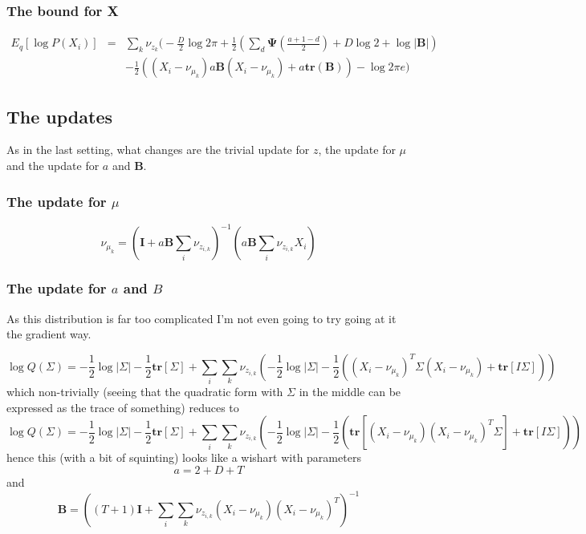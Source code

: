 \documentclass{article}
\newcommand{\digamma}{\bm{\Psi}}
\newcommand{\m}[1]{\nu_{#1}}
\begin{document}
\subsubsection{The bound for X}
\label{sec:bound-x-1}


\begin{eqnarray*}
  E_q[\log P(X_i)] &=& \sum_k \m{z_k} \Big( - \frac{D}{2}\log 2\pi 
    +\frac{1}{2}\left(\sum_d \digamma\left(\frac{a+1-d}{2}\right) 
    + D \log 2 + \log |\mathbf{B}|\right) \\
    && 
    -\frac{1}{2}((X_i - \m{\mu_k})a\mathbf{B}(X_i - \m{\mu_k})+ a\mathbf{tr}(\mathbf{B}))- \log 2 \pi e  \Big)
\end{eqnarray*}

\subsection{The updates}
\label{sec:updates-2}

As in the last setting, what changes are the trivial update for $z$,
the update for $\mu$ and the update for $a$ and $\mathbf{B}$.

\subsubsection{The update for $\mu$}
\label{sec:update-mu-3}

\begin{equation}
  \m{\mu_k} = \left(\mathbf{I}+ a\mathbf{B}\sum_i \m{z_{i,k}}\right)^{-1}
    \left(a\mathbf{B}\sum_i \m{z_{i,k}} X_i\right)
\end{equation}

\subsubsection{The update for $a$ and $B$}
\label{sec:update-a-b}

As this distribution is far too complicated I'm not even going to try
going at it the gradient way.

\[
\log Q(\Sigma) = -\frac{1}{2}\log |\Sigma| - \frac{1}{2} \mathbf{tr}[\Sigma]
+ \sum_i \sum_k \m{z_{i,k}} \left( -\frac{1}{2}\log |\Sigma| - \frac{1}{2}((X_i-\m{\mu_k})^T\Sigma(X_i-\m{\mu_k})+\mathbf{tr}[I \Sigma]) \right)
\]
which non-trivially (seeing that the quadratic form with $\Sigma$ in
the middle can be expressed as the trace of something) reduces to
\[
\log Q(\Sigma) = -\frac{1}{2}\log |\Sigma| - \frac{1}{2} \mathbf{tr}[\Sigma]
+ \sum_i \sum_k \m{z_{i,k}} \left( -\frac{1}{2}\log |\Sigma| - \frac{1}{2}(\mathbf{tr}[(X_i-\m{\mu_k})(X_i-\m{\mu_k})^T\Sigma]+\mathbf{tr}[I \Sigma]) \right)
\]
hence this (with a bit of squinting) looks like a wishart with parameters
\[
a = 2 + D + T
\]
and
\[
\mathbf{B} = \left((T+1)\mathbf{I} + \sum_i \sum_k \m{z_{i,k}}(X_i-\m{\mu_k})(X_i-\m{\mu_k})^T\right)^{-1}
\]
\end{document}
